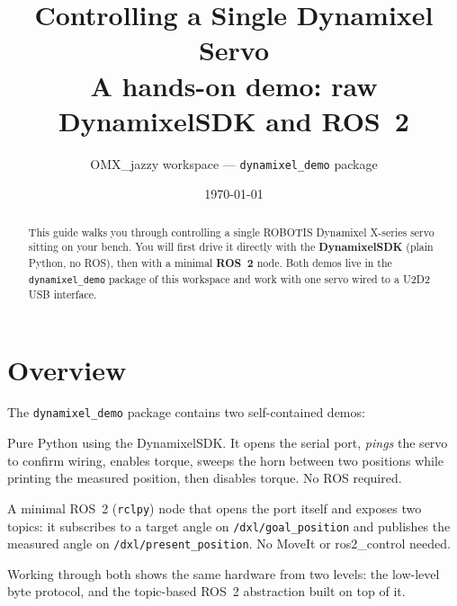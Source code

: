 \documentclass[11pt,a4paper]{article}
\title{\textbf{Controlling a Single Dynamixel Servo}\\[4pt]
  \large A hands-on demo: raw DynamixelSDK and ROS~2}
\author{OMX\_jazzy workspace --- \texttt{dynamixel\_demo} package}
\date{\today}
\begin{document}
\maketitle

\begin{abstract}
\noindent This guide walks you through controlling a single ROBOTIS Dynamixel
X-series servo sitting on your bench. You will first drive it directly with the
\textbf{DynamixelSDK} (plain Python, no ROS), then with a minimal \textbf{ROS~2}
node. Both demos live in the \texttt{dynamixel\_demo} package of this workspace and
work with one servo wired to a U2D2 USB interface.
\end{abstract}

\tableofcontents
\vspace{1em}

\section{Overview}
The \texttt{dynamixel\_demo} package contains two self-contained demos:
\begin{description}[leftmargin=1.6cm,style=nextline]
  \item[Demo~1 --- \texttt{single\_servo\_demo.py}] Pure Python using the
    DynamixelSDK. It opens the serial port, \emph{pings} the servo to confirm
    wiring, enables torque, sweeps the horn between two positions while printing
    the measured position, then disables torque. No ROS required.
  \item[Demo~2 --- \texttt{servo\_ros\_node.py}] A minimal ROS~2 (\texttt{rclpy})
    node that opens the port itself and exposes two topics: it subscribes to a
    target angle on \texttt{/dxl/goal\_position} and publishes the measured angle
    on \texttt{/dxl/present\_position}. No MoveIt or ros2\_control needed.
\end{description}

Working through both shows the same hardware from two levels: the low-level byte
protocol, and the topic-based ROS~2 abstraction built on top of it.

\end{document}
